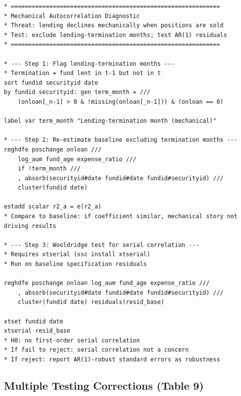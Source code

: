 \documentclass[11pt, a4paper]{article}
\begin{document}
\begin{lstlisting}[language={}]
* ============================================================
* Mechanical Autocorrelation Diagnostic
* Threat: lending declines mechanically when positions are sold
* Test: exclude lending-termination months; test AR(1) residuals
* ============================================================

* --- Step 1: Flag lending-termination months ---
* Termination = fund lent in t-1 but not in t
sort fundid securityid date
by fundid securityid: gen term_month = ///
    (onloan[_n-1] > 0 & !missing(onloan[_n-1])) & (onloan == 0)

label var term_month "Lending-termination month (mechanical)"

* --- Step 2: Re-estimate baseline excluding termination months ---
reghdfe poschange onloan ///
    log_aum fund_age expense_ratio ///
    if !term_month ///
    , absorb(securityid#date fundid#date fundid#securityid) ///
    cluster(fundid date)

estadd scalar r2_a = e(r2_a)
* Compare to baseline: if coefficient similar, mechanical story not driving results

* --- Step 3: Wooldridge test for serial correlation ---
* Requires xtserial (ssc install xtserial)
* Run on baseline specification residuals

reghdfe poschange onloan log_aum fund_age expense_ratio ///
    , absorb(securityid#date fundid#date fundid#securityid) ///
    cluster(fundid date) residuals(resid_base)

xtset fundid date
xtserial resid_base
* H0: no first-order serial correlation
* If fail to reject: serial correlation not a concern
* If reject: report AR(1)-robust standard errors as robustness
\end{lstlisting}

\subsection{Multiple Testing Corrections (Table 9)}\label{sec:stata-mt}
\end{document}
